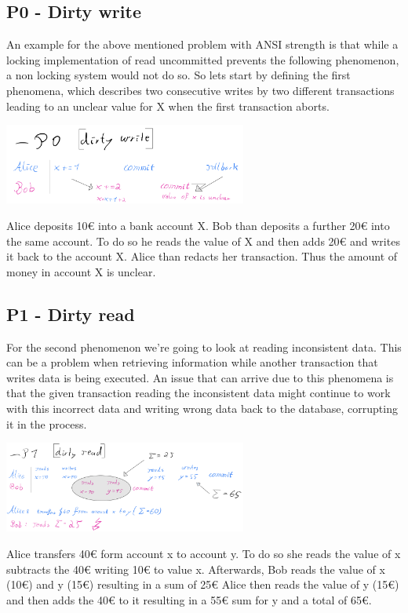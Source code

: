 \documentclass[sigconf, review=true]{acmart}
\begin{document}
\subsection{P0 - Dirty write}
An example for the above mentioned problem with ANSI strength is that while a locking implementation of read uncommitted
prevents the following phenomenon, a non locking system would not do so.
So lets start by defining the first phenomena, which describes two consecutive writes by two different
transactions leading to an unclear value for X when the first transaction aborts.

\includegraphics[width=8cm]{P0}

\begin{example}
    Alice deposits 10€ into a bank account X.
    Bob than deposits a further 20€ into the same account.
    To do so he reads the value of X and then adds 20€ and writes it back to the account X.
    Alice than redacts her transaction.
    Thus the amount of money in account X is unclear.
\end{example}

\subsection{P1 - Dirty read}
For the second phenomenon we're going to look at reading inconsistent data.
This can be a problem when retrieving information while another transaction
that writes data is being executed. An issue that can arrive due to this phenomena is
that the given transaction reading the inconsistent data might continue to work with this
incorrect data and writing wrong data back to the database, corrupting it in the process.

\includegraphics[width=8cm]{P1}
\begin{example}
    Alice transfers 40€ form account x to account y.
    To do so she reads the value of x subtracts the 40€ writing 10€ to value x.
    Afterwards, Bob reads the value of x (10€) and y (15€) resulting in a sum of 25€
    Alice then reads the value of y (15€) and then adds the 40€ to it resulting in a 55€ sum for y
    and a total of 65€.
\end{example}
\end{document}
